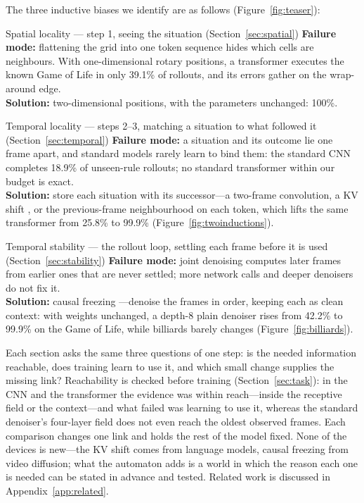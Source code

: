 \documentclass[11pt]{article}
\begin{document}
The three inductive biases we identify are as follows (Figure~\ref{fig:teaser}):

\begin{insight}{Spatial locality --- step 1, seeing the situation (Section~\ref*{sec:spatial})}
\textbf{Failure mode:} flattening the grid into one token sequence hides which cells are neighbours. With one-dimensional rotary positions, a transformer executes the known Game of Life in only 39.1\% of rollouts, and its errors gather on the wrap-around edge.\\
\textbf{Solution:} two-dimensional positions, with the parameters unchanged: 100\%.
\end{insight}

\begin{insight}{Temporal locality --- steps 2--3, matching a situation to what followed it (Section~\ref*{sec:temporal})}
\textbf{Failure mode:} a situation and its outcome lie one frame apart, and standard models rarely learn to bind them: the standard CNN completes 18.9\% of unseen-rule rollouts; no standard transformer within our budget is exact.\\
\textbf{Solution:} store each situation with its successor---a two-frame convolution, a KV shift \citep{xu2024kvshift}, or the previous-frame neighbourhood on each token, which lifts the same transformer from 25.8\% to 99.9\% (Figure~\ref{fig:twoinductions}).
\end{insight}

\begin{insight}{Temporal stability --- the rollout loop, settling each frame before it is used (Section~\ref*{sec:stability})}
\textbf{Failure mode:} joint denoising computes later frames from earlier ones that are never settled; more network calls and deeper denoisers do not fix it.\\
\textbf{Solution:} causal freezing \citep{chen2024diffusion}---denoise the frames in order, keeping each as clean context: with weights unchanged, a depth-8 plain denoiser rises from 42.2\% to 99.9\% on the Game of Life, while billiards barely changes (Figure~\ref{fig:billiards}).
\end{insight}

Each section asks the same three questions of one step: is the needed information reachable, does training learn to use it, and which small change supplies the missing link? Reachability is checked before training (Section~\ref{sec:task}): in the CNN and the transformer the evidence was within reach---inside the receptive field or the context---and what failed was learning to use it, whereas the standard denoiser's four-layer field does not even reach the oldest observed frames. Each comparison changes one link and holds the rest of the model fixed. None of the devices is new---the KV shift comes from language models, causal freezing from video diffusion; what the automaton adds is a world in which the reason each one is needed can be stated in advance and tested. Related work is discussed in Appendix~\ref{app:related}.
\end{document}
